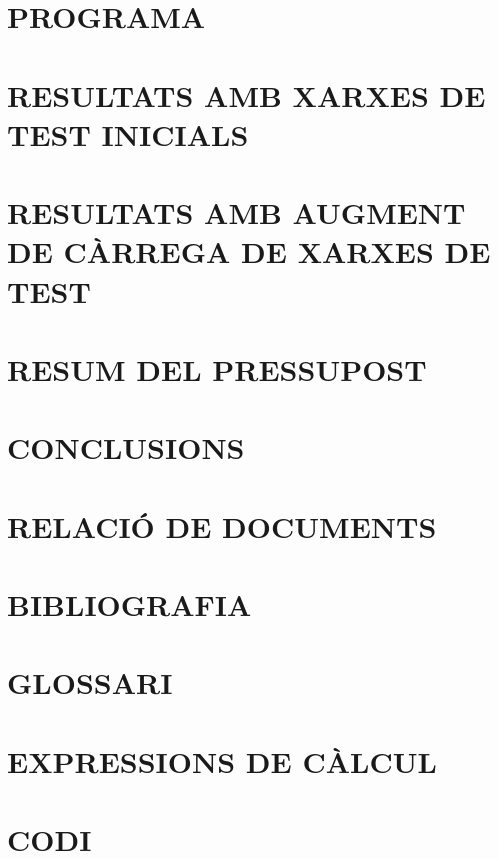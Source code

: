 \documentclass[11pt, a4paper]{report} %
\newcommand{\·}{\hspace{-1pt}·\hspace{-1pt}}
\begin{document}
\chapter{PROGRAMA}


\chapter{RESULTATS AMB XARXES DE TEST INICIALS}


\chapter{RESULTATS AMB AUGMENT DE CÀRREGA DE XARXES DE TEST}


\chapter{RESUM DEL PRESSUPOST}


\chapter{CONCLUSIONS}


\chapter{RELACIÓ DE DOCUMENTS}


\chapter{BIBLIOGRAFIA}


\chapter{GLOSSARI}


\appendix

\chapter{EXPRESSIONS DE CÀLCUL}


\chapter{CODI}

\end{document}
